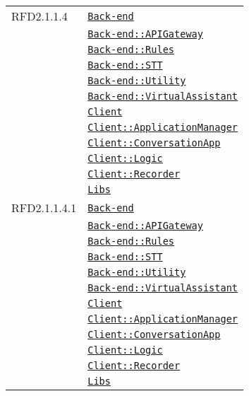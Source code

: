 \begin{longtable}{|>{\centering}m{3cm}|m{10cm}<{\centering}|}
RFD2.1.1.4 & \hyperref[Back-end]{\texttt{Back-end}}\\
& \hyperref[Back-end::APIGateway]{\texttt{Back-end::APIGateway}}\\
& \hyperref[Back-end::Rules]{\texttt{Back-end::Rules}}\\
& \hyperref[Back-end::STT]{\texttt{Back-end::STT}}\\
& \hyperref[Back-end::Utility]{\texttt{Back-end::Utility}}\\
& \hyperref[Back-end::VirtualAssistant]{\texttt{Back-end::VirtualAssistant}}\\
& \hyperref[Client]{\texttt{Client}}\\
& \hyperref[Client::ApplicationManager]{\texttt{Client::ApplicationManager}}\\
& \hyperref[Client::ConversationApp]{\texttt{Client::ConversationApp}}\\
& \hyperref[Client::Logic]{\texttt{Client::Logic}}\\
& \hyperref[Client::Recorder]{\texttt{Client::Recorder}}\\
& \hyperref[Libs]{\texttt{Libs}}\\ \hline

RFD2.1.1.4.1 & \hyperref[Back-end]{\texttt{Back-end}}\\
& \hyperref[Back-end::APIGateway]{\texttt{Back-end::APIGateway}}\\
& \hyperref[Back-end::Rules]{\texttt{Back-end::Rules}}\\
& \hyperref[Back-end::STT]{\texttt{Back-end::STT}}\\
& \hyperref[Back-end::Utility]{\texttt{Back-end::Utility}}\\
& \hyperref[Back-end::VirtualAssistant]{\texttt{Back-end::VirtualAssistant}}\\
& \hyperref[Client]{\texttt{Client}}\\
& \hyperref[Client::ApplicationManager]{\texttt{Client::ApplicationManager}}\\
& \hyperref[Client::ConversationApp]{\texttt{Client::ConversationApp}}\\
& \hyperref[Client::Logic]{\texttt{Client::Logic}}\\
& \hyperref[Client::Recorder]{\texttt{Client::Recorder}}\\
& \hyperref[Libs]{\texttt{Libs}}\\ \hline


\end{longtable}
